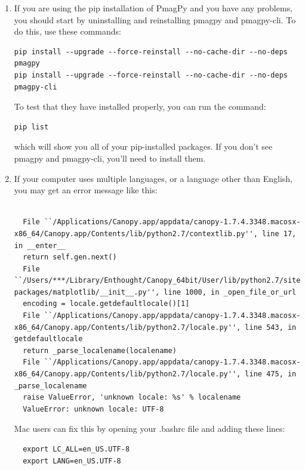 \documentclass[11pt]{book}
\begin{document}
{{\begin{enumerate}
  \begin{itemize}
  \item  For Mac users with a \href{#developer_install}{developer_install}, it is possible that you need to make the python scripts executable. On the command line in the directory with the scripts, type: chmod a+x *.py
  \end{itemize}

\item
  If you are using the pip installation of PmagPy and you have any problems, you should start by uninstalling and reinstalling pmagpy and pmagpy-cli.  To do this, use these commands:
\begin{verbatim}
pip install --upgrade --force-reinstall --no-cache-dir --no-deps pmagpy
pip install --upgrade --force-reinstall --no-cache-dir --no-deps pmagpy-cli
\end{verbatim}
To test that they have installed properly, you can run the command:
\begin{verbatim}
pip list
\end{verbatim}
which will show you all of your pip-installed packages.  If you don't see pmagpy and pmagpy-cli, you'll need to install them.

\item
  If your computer uses multiple languages, or a language other than English, you may get an error message like this:
  \begin{verbatim}

  File ``/Applications/Canopy.app/appdata/canopy-1.7.4.3348.macosx-x86_64/Canopy.app/Contents/lib/python2.7/contextlib.py'', line 17, in __enter__
  return self.gen.next()
  File ``/Users/***/Library/Enthought/Canopy_64bit/User/lib/python2.7/site-packages/matplotlib/__init__.py'', line 1000, in _open_file_or_url
  encoding = locale.getdefaultlocale()[1]
  File ``/Applications/Canopy.app/appdata/canopy-1.7.4.3348.macosx-x86_64/Canopy.app/Contents/lib/python2.7/locale.py'', line 543, in getdefaultlocale
  return _parse_localename(localename)
  File ``/Applications/Canopy.app/appdata/canopy-1.7.4.3348.macosx-x86_64/Canopy.app/Contents/lib/python2.7/locale.py'', line 475, in _parse_localename
  raise ValueError, 'unknown locale: %s' % localename
  ValueError: unknown locale: UTF-8
  \end{verbatim}
  Mac users can fix this by opening your .bashrc file and adding these lines:
  \begin{verbatim}
  export LC_ALL=en_US.UTF-8
  export LANG=en_US.UTF-8
  \end{verbatim}


\end{enumerate}}}
\end{document}

